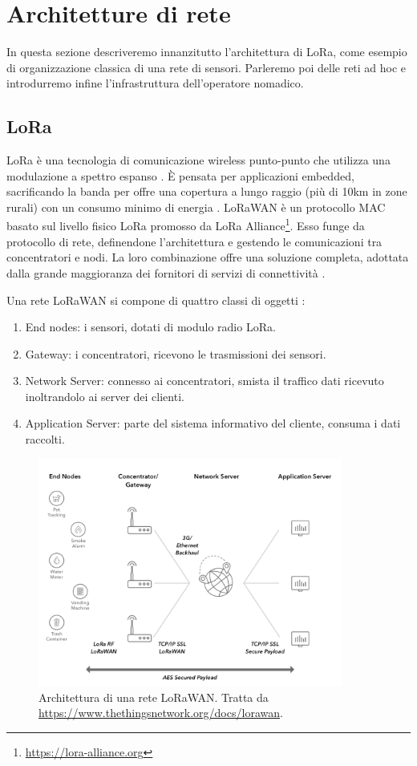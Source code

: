 \documentclass[a4paper,11pt]{article}
\theoremstyle{definition}
\begin{document}
\section{Architetture di rete}

In questa sezione descriveremo innanzitutto l'architettura di LoRa, come esempio di organizzazione classica di una rete di sensori. Parleremo poi delle reti ad hoc e introdurremo infine l'infrastruttura dell'operatore nomadico.

\subsection{LoRa}

LoRa è una tecnologia di comunicazione wireless punto-punto che utilizza una modulazione a spettro espanso \cite{loramod}. È pensata per applicazioni embedded, sacrificando la banda per offre una copertura a lungo raggio (più di 10km in zone rurali) con un consumo minimo di energia \cite{loraperf}. LoRaWAN è un protocollo MAC basato sul livello fisico LoRa promosso da LoRa Alliance\footnote{\url{https://lora-alliance.org}}. Esso funge da protocollo di rete, definendone l'architettura e gestendo le comunicazioni tra concentratori e nodi. La loro combinazione offre una soluzione completa, adottata dalla grande maggioranza dei fornitori di servizi di connettività \cite{netprov}.

Una rete LoRaWAN si compone di quattro classi di oggetti \cite{loraspec}:
\begin{enumerate}
\item End nodes: i sensori, dotati di modulo radio LoRa.
\item Gateway: i concentratori, ricevono le trasmissioni dei sensori.
\item Network Server: connesso ai concentratori, smista il traffico dati ricevuto inoltrandolo ai server dei clienti.
\item Application Server: parte del sistema informativo del cliente, consuma i dati raccolti.
\end{enumerate}

\begin{figure}[H]
\centering
\includegraphics[width=10cm]{figures/lorawan.png}
\caption{Architettura di una rete LoRaWAN. Tratta da \protect\url{https://www.thethingsnetwork.org/docs/lorawan}.}
\end{figure}
\end{document}
